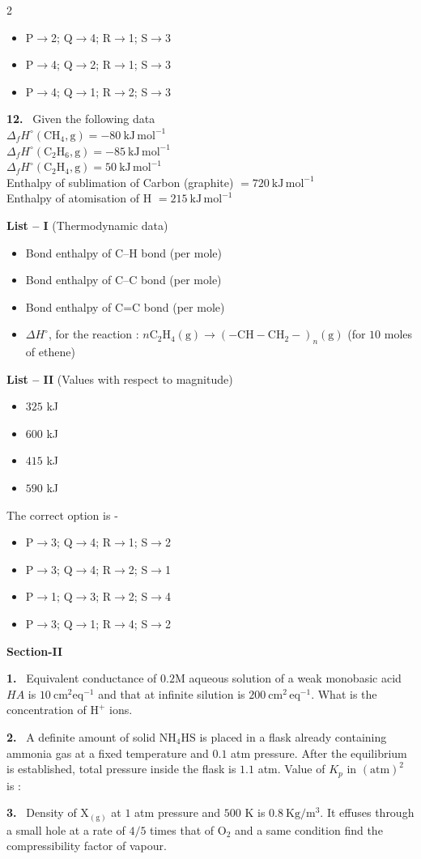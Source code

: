 \documentclass[10pt]{extarticle}
\newcommand{\sect}[1]{\par\smallskip\noindent\textbf{#1}\par}
\newcommand{\qn}[1]{\par\smallskip\noindent\textbf{#1.}~}
\newenvironment{qoptions}{\begin{itemize}[leftmargin=1.8em,itemsep=1pt,topsep=2pt,label={}]}{\end{itemize}}
\newcommand{\opt}[2]{\item[(#1)] #2}
\begin{document}
\begin{multicols}{2}
\begin{qoptions}
\opt{B}{P$\to$2; Q$\to$4; R$\to$1; S$\to$3}
\opt{C}{P$\to$4; Q$\to$2; R$\to$1; S$\to$3}
\opt{D}{P$\to$4; Q$\to$1; R$\to$2; S$\to$3}
\end{qoptions}
\qn{12} Given the following data\\
$\Delta_fH^\circ(\mathrm{CH_4,g})=-80\ \mathrm{kJ\,mol^{-1}}$\\
$\Delta_fH^\circ(\mathrm{C_2H_6,g})=-85\ \mathrm{kJ\,mol^{-1}}$\\
$\Delta_fH^\circ(\mathrm{C_2H_4,g})=50\ \mathrm{kJ\,mol^{-1}}$\\
Enthalpy of sublimation of Carbon (graphite) $=720\ \mathrm{kJ\,mol^{-1}}$\\
Enthalpy of atomisation of H $=215\ \mathrm{kJ\,mol^{-1}}$
\par\noindent\textbf{List -- I} (Thermodynamic data)
\begin{qoptions}
\opt{P}{Bond enthalpy of C--H bond (per mole)}
\opt{Q}{Bond enthalpy of C--C bond (per mole)}
\opt{R}{Bond enthalpy of C=C bond (per mole)}
\opt{S}{$\Delta H^\circ$, for the reaction : $n\mathrm{C_2H_4(g)}\longrightarrow\left(\mathrm{-CH-CH_2-}\right)_n\mathrm{(g)}$ (for $10$ moles of ethene)}
\end{qoptions}
\par\noindent\textbf{List -- II} (Values with respect to magnitude)
\begin{qoptions}
\opt{1}{$325$ kJ}
\opt{2}{$600$ kJ}
\opt{3}{$415$ kJ}
\opt{4}{$590$ kJ}
\end{qoptions}
The correct option is -
\begin{qoptions}
\opt{A}{P$\to$3; Q$\to$4; R$\to$1; S$\to$2}
\opt{B}{P$\to$3; Q$\to$4; R$\to$2; S$\to$1}
\opt{C}{P$\to$1; Q$\to$3; R$\to$2; S$\to$4}
\opt{D}{P$\to$3; Q$\to$1; R$\to$4; S$\to$2}
\end{qoptions}
\sect{Section-II}
\qn{1} Equivalent conductance of $0.2$M aqueous solution of a weak monobasic acid $HA$ is $10\ \mathrm{cm^2eq^{-1}}$ and that at infinite silution is $200\ \mathrm{cm^2\,eq^{-1}}$. What is the concentration of $\mathrm{H^+}$ ions.
\qn{2} A definite amount of solid $\mathrm{NH_4HS}$ is placed in a flask already containing ammonia gas at a fixed temperature and $0.1$ atm pressure. After the equilibrium is established, total pressure inside the flask is $1.1$ atm. Value of $K_p$ in $(\mathrm{atm})^2$ is :
\qn{3} Density of $\mathrm{X_{(g)}}$ at $1$ atm pressure and $500$ K is $0.8\ \mathrm{Kg/m^3}$. It effuses through a small hole at a rate of $4/5$ times that of $\mathrm O_2$ and a same condition find the compressibility factor of vapour.

\end{multicols}
\end{document}

